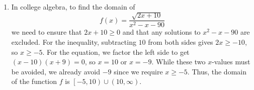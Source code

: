 \documentclass{article}
\begin{document}
\begin{enumerate}
\newpage

\item In college algebra, to find the domain of \[f(x) = \frac{\sqrt{2x + 10}}{x^2 - x - 90}\] we need to ensure that $2x + 10 \geq 0$ and that any solutions to $x^2 - x - 90$ are excluded. For the inequality, subtracting $10$ from both sides gives $2x \geq -10$, so $x \geq -5$. For the equation, we factor the left side to get $(x - 10)(x + 9) = 0$, so $x = 10$ or $x = -9$. While these two $x$-values must be avoided, we already avoid $-9$ since we require $x \geq -5$. Thus, the domain of the function $f$ is $\left[-5, 10\right) \cup (10, \infty)$.

\end{enumerate}
\end{document}

